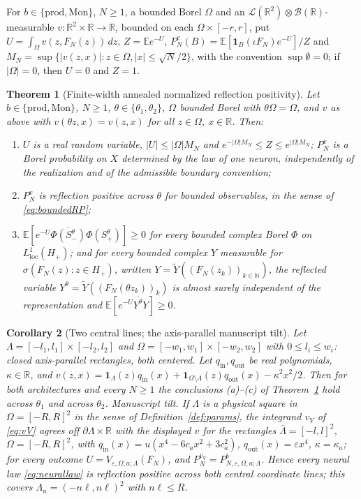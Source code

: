 \documentclass[11pt]{article}
\theoremstyle{plain}
\newtheorem{theorem}{Theorem}[section]
\newtheorem{corollary}[theorem]{Corollary}
\theoremstyle{definition}
\theoremstyle{remark}
\newcommand{\R}{\mathbb{R}}
\newcommand{\N}{\mathbb{N}}
\newcommand{\E}{\mathbb{E}}
\newcommand{\cB}{\mathcal{B}}
\newcommand{\cL}{\mathcal{L}}
\newcommand{\ind}{\mathbf{1}}
\newcommand{\bprod}{\mathrm{prod}}
\newcommand{\bMon}{\mathrm{Mon}}
\newcommand{\conj}[1]{\overline{#1}}
\begin{document}
For $b\in\{\bprod,\bMon\}$, $N\ge1$, a bounded Borel $\Omega$ and an
$\cL(\R^{2})\otimes\cB(\R)$-measurable $v:\R^{2}\times\R\to\R$, bounded on each
$\Omega\times[-r,r]$, put $U=\int_\Omega v(z,F_N(z))\,dz$, $Z=\E e^{-U}$,
$P^{v}_{N}(B)=\E[\ind_B(\iota F_N)e^{-U}]/Z$ and
$M_N=\sup\{|v(z,x)|:z\in\Omega,|x|\le\sqrt N/2\}$, with the convention
$\sup\emptyset=0$; if $|\Omega|=0$, then $U=0$ and $Z=1$.

\begin{theorem}[Finite-width annealed normalized reflection positivity]\label{thm:E-RP}
Let $b\in\{\bprod,\bMon\}$, $N\ge1$, $\theta\in\{\theta_1,\theta_2\}$, $\Omega$ bounded Borel
with $\theta\Omega=\Omega$, and $v$ as above with $v(\theta z,x)=v(z,x)$ for all $z\in\Omega$,
$x\in\R$. Then:
\begin{enumerate}[label=(\alph*)]
\item $U$ is a real random variable, $|U|\le|\Omega|M_N$ and
  $e^{-|\Omega|M_N}\le Z\le e^{|\Omega|M_N}$; $P^{v}_{N}$ is a Borel probability on $X$
  determined by the law of one neuron, independently of the realization and of the
  admissible boundary convention;
\item $P^{v}_{N}$ is reflection positive across $\theta$ for bounded observables,
  in the sense of \eqref{eq:boundedRP};
\item $\E[e^{-U}\conj{\Phi(S^{\theta}_{-})}\Phi(S^{\theta}_{+})]\ge0$ for every bounded complex
  Borel $\Phi$ on $L^{1}_{\mathrm{loc}}(H_+)$; and for every bounded complex $Y$
  measurable for $\sigma(F_N(z):z\in H_+)$, written $Y=\tilde Y((F_N(z_k))_{k\in\N})$,
  the reflected variable $Y^{\theta}=\tilde Y((F_N(\theta z_k))_k)$ is almost surely
  independent of the representation and $\E[e^{-U}\conj{Y^{\theta}}Y]\ge0$.
\end{enumerate}
\end{theorem}

\begin{corollary}[Two central lines; the axis-parallel manuscript tilt]\label{cor:E-P2}
Let $\Lambda=[-l_1,l_1]\times[-l_2,l_2]$ and $\Omega=[-w_1,w_1]\times[-w_2,w_2]$ with
$0\le l_i\le w_i$: closed axis-parallel rectangles, \emph{both centered}. Let
$q_{\mathrm{in}},q_{\mathrm{out}}$ be real polynomials, $\kappa\in\R$, and
$v(z,x)=\ind_\Lambda(z)q_{\mathrm{in}}(x)+\ind_{\Omega\setminus\Lambda}(z)q_{\mathrm{out}}(x)-\kappa^{2}x^{2}/2$.
Then for both architectures and every $N\ge1$ the conclusions (a)--(c) of
Theorem~\ref{thm:E-RP} hold across $\theta_1$ and across $\theta_2$.
\emph{Manuscript tilt.} If $\Lambda$ is a physical square in $\Omega=[-R,R]^{2}$ in
the sense of Definition~\ref{def:params}, the integrand $v_V$ of \eqref{eq:vV}
agrees off $\partial\Lambda\times\R$ with the displayed $v$ for the rectangles
$\bar\Lambda=[-l,l]^{2}$, $\Omega=[-R,R]^{2}$, with
$q_{\mathrm{in}}(x)=u(x^{4}-6c_ax^{2}+3c_a^{2})$, $q_{\mathrm{out}}(x)=\varepsilon x^{4}$,
$\kappa=\kappa_a$; for every outcome $U=V_{\varepsilon,\Omega,a;\Lambda}(F_N)$, and
$P^{v_V}_{N}=P^{b}_{N,\varepsilon,\Omega,a;\Lambda}$. Hence every neural law
\eqref{eq:neurallaw} is reflection positive across both central coordinate lines;
this covers $\Lambda_n=(-n\ell,n\ell)^{2}$ with $n\ell\le R$.
\end{corollary}
\end{document}

